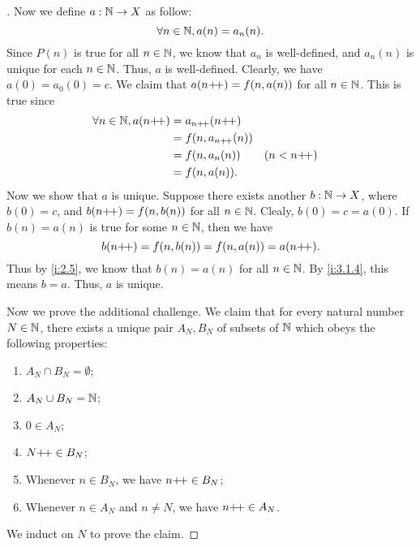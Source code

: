 \begin{proof}[]
  Now we define \(a : \mathbb{N} \to X\) as follow:
  \[
    \forall n \in \mathbb{N}, a(n) = a_n(n).
  \]
  Since \(P(n)\) is true for all \(n \in \mathbb{N}\), we know that \(a_n\) is well-defined, and \(a_n(n)\) is unique for each \(n \in \mathbb{N}\).
  Thus, \(a\) is well-defined.
  Clearly, we have \(a(0) = a_0(0) = c\).
  We claim that \(a(n{+}\!{+}) = f(n, a(n))\) for all \(n \in \mathbb{N}\).
  This is true since
  \begin{align*}
    \forall n \in \mathbb{N}, a(n{+}\!{+}) & = a_{n{+}\!{+}}(n{+}\!{+})                    \\
                              & = f(n, a_{n{+}\!{+}}(n))                 \\
                              & = f(n, a_n(n))      &  & (n < n{+}\!{+}) \\
                              & = f(n, a(n)).
  \end{align*}
  Now we show that \(a\) is unique.
  Suppose there exists another \(b : \mathbb{N} \to X\), where \(b(0) = c\), and \(b(n{+}\!{+}) = f(n, b(n))\) for all \(n \in \mathbb{N}\).
  Clealy, \(b(0) = c = a(0)\).
  If \(b(n) = a(n)\) is true for some \(n \in \mathbb{N}\), then we have
  \[
    b(n{+}\!{+}) = f(n, b(n)) = f(n, a(n)) = a(n{+}\!{+}).
  \]
  Thus by \cref{i:2.5}, we know that \(b(n) = a(n)\) for all \(n \in \mathbb{N}\).
  By \cref{i:3.1.4}, this means \(b = a\).
  Thus, \(a\) is unique.

  Now we prove the additional challenge.
  We claim that for every natural number \(N \in \mathbb{N}\), there exists a unique pair \(A_N, B_N\) of subsets of \(\mathbb{N}\) which obeys the following properties:
  \begin{enumerate}
    \item \(A_N \cap B_N = \emptyset\);
    \item \(A_N \cup B_N = \mathbb{N}\);
    \item \(0 \in A_N\);
    \item \(N{+}\!{+} \in B_N\);
    \item Whenever \(n \in B_N\), we have \(n{+}\!{+} \in B_N\);
    \item Whenever \(n \in A_N\) and \(n \neq N\), we have \(n{+}\!{+} \in A_N\).
  \end{enumerate}
  We induct on \(N\) to prove the claim.


\end{proof}
